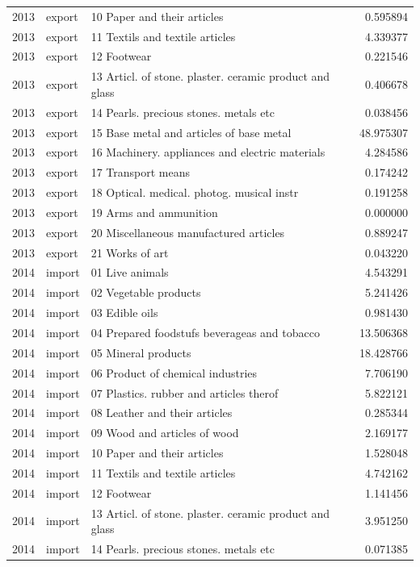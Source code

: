 \begin{tabular}{rllr}
2013 & export & 10 Paper and their articles & 0.595894 \\
2013 & export & 11 Textils and textile articles & 4.339377 \\
2013 & export & 12 Footwear & 0.221546 \\
2013 & export & 13 Articl. of stone. plaster. ceramic product and glass & 0.406678 \\
2013 & export & 14 Pearls. precious stones. metals etc & 0.038456 \\
2013 & export & 15 Base metal and articles of base metal & 48.975307 \\
2013 & export & 16 Machinery. appliances and electric materials & 4.284586 \\
2013 & export & 17 Transport means & 0.174242 \\
2013 & export & 18 Optical. medical. photog. musical instr & 0.191258 \\
2013 & export & 19 Arms and ammunition & 0.000000 \\
2013 & export & 20 Miscellaneous manufactured articles & 0.889247 \\
2013 & export & 21 Works of art & 0.043220 \\
2014 & import & 01 Live animals & 4.543291 \\
2014 & import & 02 Vegetable products & 5.241426 \\
2014 & import & 03 Edible oils & 0.981430 \\
2014 & import & 04 Prepared foodstufs beverageas and tobacco & 13.506368 \\
2014 & import & 05 Mineral products & 18.428766 \\
2014 & import & 06 Product of chemical industries & 7.706190 \\
2014 & import & 07 Plastics. rubber and articles therof & 5.822121 \\
2014 & import & 08 Leather and their articles & 0.285344 \\
2014 & import & 09 Wood and articles of wood & 2.169177 \\
2014 & import & 10 Paper and their articles & 1.528048 \\
2014 & import & 11 Textils and textile articles & 4.742162 \\
2014 & import & 12 Footwear & 1.141456 \\
2014 & import & 13 Articl. of stone. plaster. ceramic product and glass & 3.951250 \\
2014 & import & 14 Pearls. precious stones. metals etc & 0.071385 \\

\end{tabular}
